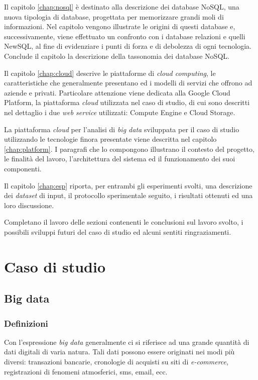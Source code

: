 Il capitolo \ref{chap:nosql} è destinato alla descrizione dei database NoSQL, una nuova tipologia di database, progettata per memorizzare grandi moli di informazioni.
Nel capitolo vengono illustrate le origini di questi database e, successivamente, viene effettuato un confronto con 
i database relazioni e quelli NewSQL, al fine di evidenziare i punti di forza e di debolezza di ogni tecnologia. Conclude il capitolo la descrizione della tassonomia 
dei database NoSQL.

Il capitolo \ref{chap:cloud} descrive le piattaforme di \textit{cloud computing}, le caratteristiche che generalmente presentano ed i modelli di servizi che offrono ad aziende e privati.
Particolare attenzione viene dedicata alla Google Cloud Platform, la piattaforma \textit{cloud} utilizzata nel caso di studio, 
di cui sono descritti nel dettaglio i due \textit{web service} utilizzati: Compute Engine e Cloud Storage.

La piattaforma \textit{cloud} per l'analisi di \textit{big data} sviluppata per il caso di studio utilizzando le tecnologie finora presentate viene descritta nel capitolo \ref{chap:platform}.
I paragrafi che lo compongono illustrano il contesto del progetto, le finalità del lavoro, l'architettura del sistema ed il funzionamento dei suoi componenti.

Il capitolo \ref{chap:esp} riporta, per entrambi gli esperimenti svolti, una descrizione dei \textit{dataset} di input, il protocollo sperimentale seguito, i risultati ottenuti ed 
una loro discussione.

Completano il lavoro delle sezioni contenenti le conclusioni sul lavoro svolto, i possibili sviluppi futuri del caso di studio ed alcuni sentiti ringraziamenti.

\part{Caso di studio}

\chapter{Big data}
\label{chap:bigdata}

\section{Definizioni}
\label{par:defbigdata}

Con l'espressione \textit{big data} generalmente ci si riferisce ad una grande quantità di dati digitali di varia natura. Tali dati possono essere originati nei 
modi più diversi: transazioni bancarie, cronologie di acquisti su siti di \textit{e-commerce}, registrazioni di fenomeni atmosferici, sms, email, ecc.

